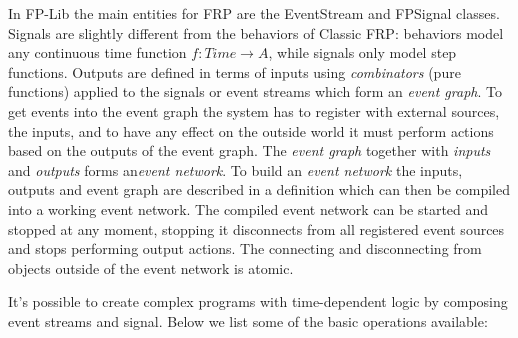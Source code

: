 \documentclass{article}
\begin{document}
In FP-Lib the main entities for FRP are the EventStream and FPSignal classes. Signals are slightly different from the behaviors of Classic FRP: behaviors model any continuous time function $f:Time\rightarrow A$, while signals only model step functions.  Outputs are defined in terms of inputs using \emph{combinators} (pure functions) applied to the signals or event streams which form an \emph{event graph}. To get events into the event graph the system has to register with external sources, the inputs, and to have any effect on the outside world it must perform actions based on the outputs of the event graph. The \emph{event graph} together with \emph{inputs} and \emph{outputs} forms an\emph{event network}. To build an \emph{event network} the inputs, outputs and event graph are described in a definition which can then be compiled into a working event network. The compiled event network can be started and stopped at any moment, stopping it disconnects from all registered event sources and stops performing output actions. The connecting and disconnecting from objects outside of the event network is atomic. 

It's possible to create complex programs with time-dependent logic by composing  event streams and signal. Below we list some of the basic operations available:
\end{document}
